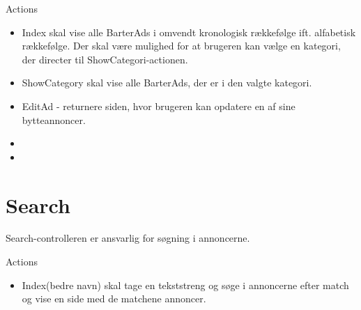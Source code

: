 Actions 
\begin{itemize}
	\item Index skal vise alle BarterAds i omvendt kronologisk rækkefølge ift. alfabetisk rækkefølge. Der skal være mulighed for at brugeren kan vælge en kategori, der directer til ShowCategori-actionen.
	\item ShowCategory skal vise alle BarterAds, der er i den valgte kategori.
	\item EditAd - returnere siden, hvor brugeren kan opdatere en af sine bytteannoncer.
	\item 
	\item
\end{itemize}


\section{Search}
Search-controlleren er ansvarlig for søgning i annoncerne. 

Actions 
\begin{itemize}
	\item Index(bedre navn) skal tage en tekststreng og søge i annoncerne efter match og vise en side med de matchene annoncer.
\end{itemize}
